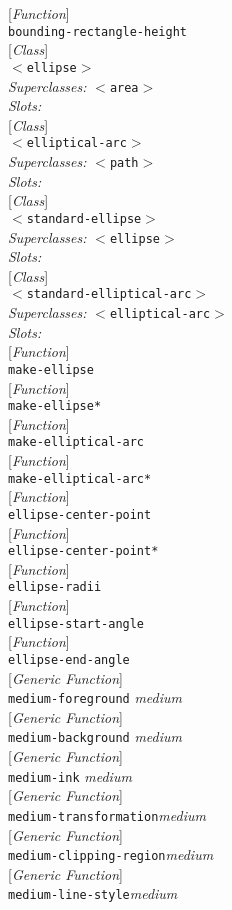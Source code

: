 \documentclass[10pt]{book}
\newenvironment{defother}[2]{[\textit{#1}]\\\texttt{#2}}{\\}
\newenvironment{defun}[1]{\begin{defother}{Function}{#1}}{\end{defother}}
\newenvironment{defgeneric}[1]{\begin{defother}{Generic Function}{#1}}{\end{defother}}
\newenvironment{defclass}[2]{[\textit{Class}]\\\texttt{#1}\\\textit{Superclasses:} \texttt{#2}\\\textit{Slots:}}{\\}
\begin{document}
\begin{defun}{bounding-rectangle-height}\end{defun}
\begin{defclass}{$<$ellipse$>$}{$<$area$>$}\end{defclass}
\begin{defclass}{$<$elliptical-arc$>$}{$<$path$>$}\end{defclass}
\begin{defclass}{$<$standard-ellipse$>$}{$<$ellipse$>$}\end{defclass}
\begin{defclass}{$<$standard-elliptical-arc$>$}{$<$elliptical-arc$>$}\end{defclass}
\begin{defun}{make-ellipse}\end{defun}
\begin{defun}{make-ellipse*}\end{defun}
\begin{defun}{make-elliptical-arc}\end{defun}
\begin{defun}{make-elliptical-arc*}\end{defun}
\begin{defun}{ellipse-center-point}\end{defun}
\begin{defun}{ellipse-center-point*}\end{defun}
\begin{defun}{ellipse-radii}\end{defun}
\begin{defun}{ellipse-start-angle}\end{defun}
\begin{defun}{ellipse-end-angle}\end{defun}
\begin{defgeneric}{medium-foreground} \textit{medium}\end{defgeneric}
\begin{defgeneric}{medium-background} \textit{medium}\end{defgeneric}
\begin{defgeneric}{medium-ink} \textit{medium}\end{defgeneric}
\begin{defgeneric}{medium-transformation}\textit{medium}\end{defgeneric}
\begin{defgeneric}{medium-clipping-region}\textit{medium}\end{defgeneric}
\begin{defgeneric}{medium-line-style}\textit{medium}\end{defgeneric}
\end{document}
